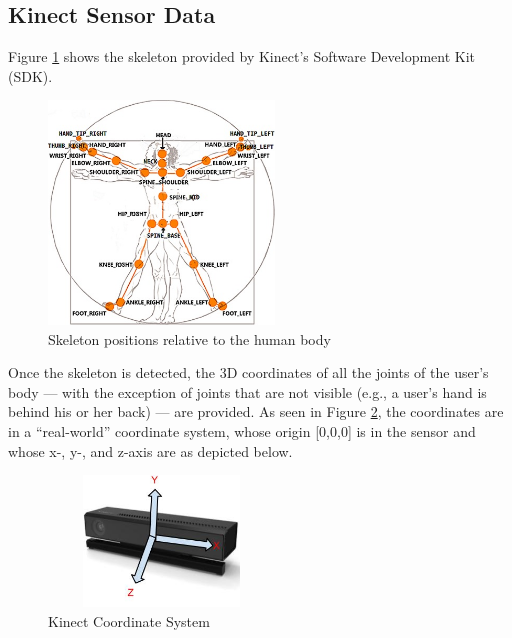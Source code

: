 \documentclass[11pt,twocolumn,varwidth=true,a4paper,fleqn]{sigchi}
\begin{document}
\subsection{Kinect Sensor Data}
Figure \ref{skeleton} shows the skeleton provided by Kinect's Software Development Kit (SDK).
\begin{figure}[h]
\centering
\includegraphics[width=60mm]{skeleton.jpg}
\caption{Skeleton positions relative to the human body}
\label{skeleton}
\end{figure}
Once the skeleton is detected, the 3D coordinates of all the joints of the
user's body --- with the exception of joints that are not visible (e.g., a user's
hand is behind his or her back) --- are provided.
As seen in Figure \ref{Coordinate}, the coordinates are in a ``real-world''
coordinate system, whose origin [0,0,0] is in the sensor and whose x-, y-, and
z-axis are as depicted below.
\begin{figure}[h]
\centering
\includegraphics[width=60mm, height=35mm]{KinectV2CoordinateSystem.jpg}
\caption{Kinect Coordinate System}
\label{Coordinate}
\end{figure}
\end{document}
